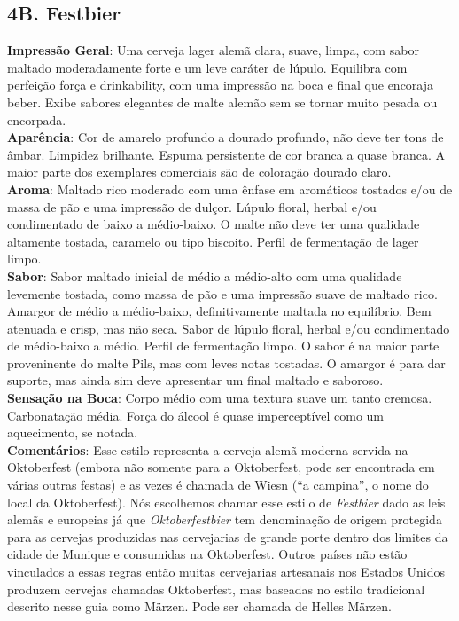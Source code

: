 \subsection*{4B. Festbier}
\textbf{Impressão Geral}: Uma cerveja lager alemã clara, suave, limpa, com sabor maltado moderadamente forte e um leve caráter de lúpulo. Equilibra com perfeição força e drinkability, com uma impressão na boca e final que encoraja beber. Exibe sabores elegantes de malte alemão sem se tornar muito pesada ou encorpada. \\
\textbf{Aparência}: Cor de amarelo profundo a dourado profundo, não deve ter tons de âmbar. Limpidez brilhante. Espuma persistente de cor branca a quase branca. A maior parte dos exemplares comerciais são de coloração dourado claro. \\
\textbf{Aroma}: Maltado rico moderado com uma ênfase em aromáticos tostados e/ou de massa de pão e uma impressão de dulçor. Lúpulo floral, herbal e/ou condimentado de baixo a médio-baixo. O malte não deve ter uma qualidade altamente tostada, caramelo ou tipo biscoito. Perfil de fermentação de lager limpo. \\
\textbf{Sabor}: Sabor maltado inicial de médio a médio-alto com uma qualidade levemente tostada, como massa de pão e uma impressão suave de maltado rico. Amargor de médio a médio-baixo, definitivamente maltada no equilíbrio. Bem atenuada e crisp, mas não seca. Sabor de lúpulo floral, herbal e/ou condimentado de médio-baixo a médio. Perfil de fermentação limpo. O sabor é na maior parte proveninente do malte Pils, mas com leves notas tostadas. O amargor é para dar suporte, mas ainda sim deve apresentar um final maltado e saboroso. \\
\textbf{Sensação na Boca}: Corpo médio com uma textura suave um tanto cremosa. Carbonatação média. Força do álcool é quase imperceptível como um aquecimento, se notada. \\
\textbf{Comentários}: Esse estilo representa a cerveja alemã moderna servida na Oktoberfest (embora não somente para a Oktoberfest, pode ser encontrada em várias outras festas) e as vezes é chamada de Wiesn (“a campina”, o nome do local da Oktoberfest). Nós escolhemos chamar esse estilo de \textit{Festbier} dado as leis alemãs e europeias já que \textit{Oktoberfestbier} tem denominação de origem protegida para as cervejas produzidas nas cervejarias de grande porte dentro dos limites da cidade de Munique e consumidas na Oktoberfest. Outros países não estão vinculados a essas regras então muitas cervejarias artesanais nos Estados Unidos produzem cervejas chamadas Oktoberfest, mas baseadas no estilo tradicional descrito nesse guia como Märzen. Pode ser chamada de Helles Märzen. \\
